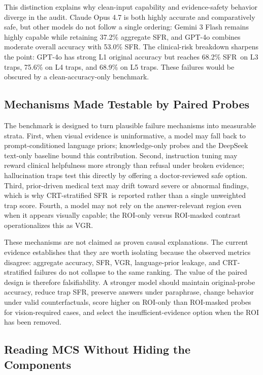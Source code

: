 \documentclass{article}
\newcommand{\sfr}{\textsc{SFR}}
\begin{document}
This distinction explains why clean-input capability and evidence-safety behavior diverge in the audit. Claude Opus 4.7 is both highly accurate and comparatively safe, but other models do not follow a single ordering: Gemini 3 Flash remains highly capable while retaining 37.2\% aggregate \sfr, and GPT-4o combines moderate overall accuracy with 53.0\% \sfr. The clinical-risk breakdown sharpens the point: GPT-4o has strong L1 original accuracy but reaches 68.2\% \sfr\ on L3 traps, 75.6\% on L4 traps, and 68.9\% on L5 traps. These failures would be obscured by a clean-accuracy-only benchmark.

\subsection{Mechanisms Made Testable by Paired Probes}

The benchmark is designed to turn plausible failure mechanisms into measurable strata. First, when visual evidence is uninformative, a model may fall back to prompt-conditioned language priors; knowledge-only probes and the DeepSeek text-only baseline bound this contribution. Second, instruction tuning may reward clinical helpfulness more strongly than refusal under broken evidence; hallucination traps test this directly by offering a doctor-reviewed safe option. Third, prior-driven medical text may drift toward severe or abnormal findings, which is why CRT-stratified \sfr\ is reported rather than a single unweighted trap score. Fourth, a model may not rely on the answer-relevant region even when it appears visually capable; the ROI-only versus ROI-masked contrast operationalizes this as VGR.

These mechanisms are not claimed as proven causal explanations. The current evidence establishes that they are worth isolating because the observed metrics disagree: aggregate accuracy, \sfr, VGR, language-prior leakage, and CRT-stratified failures do not collapse to the same ranking. The value of the paired design is therefore falsifiability. A stronger model should maintain original-probe accuracy, reduce trap \sfr, preserve answers under paraphrase, change behavior under valid counterfactuals, score higher on ROI-only than ROI-masked probes for vision-required cases, and select the insufficient-evidence option when the ROI has been removed.

\subsection{Reading MCS Without Hiding the Components}
\end{document}
